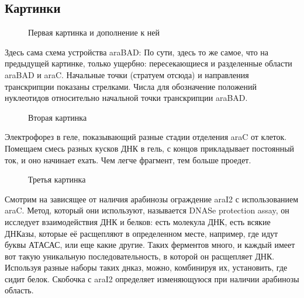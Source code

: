 \subsection{Картинки}
\begin{figure}[H]
	\centering {}  
	\caption{Первая картинка и дополнение к ней}
\end{figure}
Здесь сама схема устройства araBAD: 
По сути, здесь то же самое, что на предыдущей картинке, только ущербно: пересекающиеся и разделенные области araBAD и araC. Начальные точки (стратуем отсюда) и направления транскрипции показаны стрелками. Числа для обозначение положений нуклеотидов  относительно начальной точки транскрипции araBAD.
\begin{figure}[H]\label{ul}
	\caption{Вторая картинка}
\end{figure} 
Электрофорез в геле, показывающий разные стадии отделения araC от клеток. Помещаем смесь разных кусков ДНК в гель, с концов прикладывает постоянный ток, и оно начинает ехать. Чем легче фрагмент, тем больше проедет.
\begin{figure}[H]\label{ul}
	\caption{Третья картинка}
\end{figure} 

Смотрим на зависящее от наличия арабинозы ограждение araI2 с использованием araC. Метод, который они используют, называется DNASe protection assay, он исследует взаимодействия ДНК и белков: есть молекула ДНК, есть всякие ДНКазы, которые её расщепляют в определенном месте, например, где идут буквы АТАСАС, или еще какие другие. Таких ферментов много, и каждый имеет вот такую уникальную последовательность, в которой он расщепляет ДНК. Используя разные наборы таких днказ, можно, комбинируя их, установить, где сидит белок. Скобочка с araI2 определяет изменяющуюся при наличии арабинозы область.

